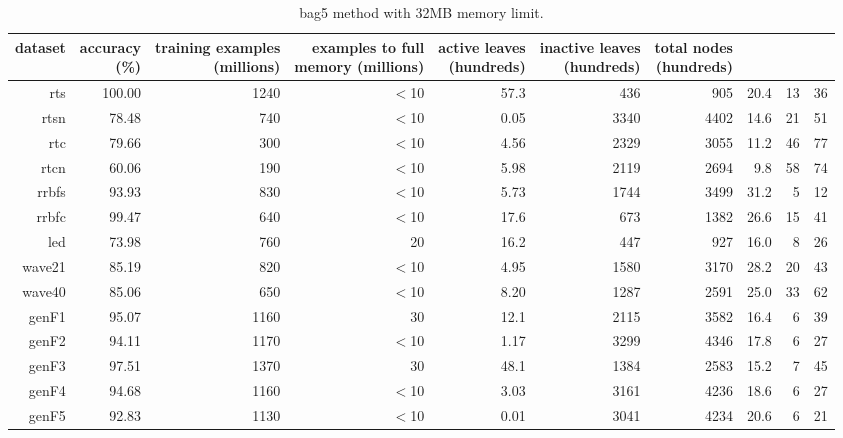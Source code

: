 \clearpage
\begin{table}
\caption{{\sc bag5} method with 32MB memory limit.}
\label{tab:bag5-32MB}
\centering
\begin{tabular}{|r|r|r|r|r|r|r|r|r|r|}
\hline
dataset	&
\rotatebox{90}{\parbox{9em}{accuracy\\(\%)}} &
\rotatebox{90}{\parbox{9em}{training examples\\(millions)}} &
\rotatebox{90}{\parbox{9em}{examples to full\\memory (millions)}} &
\rotatebox{90}{\parbox{9em}{active leaves\\(hundreds)}} &
\rotatebox{90}{\parbox{9em}{inactive leaves\\(hundreds)}} &
\rotatebox{90}{\parbox{9em}{total nodes\\(hundreds)}} &
\rotatebox{90}{\parbox{9em}{average tree depth}}	&
\rotatebox{90}{\parbox{9em}{training speed (\%)}} &
\rotatebox{90}{\parbox{9em}{prediction speed (\%)}} \\
\hline
{\sc rts} & 100.00 & 1240 & $<$10 & 57.3 & 436 & 905 & 20.4 & 13 & 36 \\
{\sc rtsn} & 78.48 & 740 & $<$10 & 0.05 & 3340 & 4402 & 14.6 & 21 & 51 \\
{\sc rtc} & 79.66 & 300 & $<$10 & 4.56 & 2329 & 3055 & 11.2 & 46 & 77 \\
{\sc rtcn} & 60.06 & 190 & $<$10 & 5.98 & 2119 & 2694 & 9.8 & 58 & 74 \\
{\sc rrbfs} & 93.93 & 830 & $<$10 & 5.73 & 1744 & 3499 & 31.2 & 5 & 12 \\
{\sc rrbfc} & 99.47 & 640 & $<$10 & 17.6 & 673 & 1382 & 26.6 & 15 & 41 \\
{\sc led} & 73.98 & 760 & 20 & 16.2 & 447 & 927 & 16.0 & 8 & 26 \\
{\sc wave21} & 85.19 & 820 & $<$10 & 4.95 & 1580 & 3170 & 28.2 & 20 & 43 \\
{\sc wave40} & 85.06 & 650 & $<$10 & 8.20 & 1287 & 2591 & 25.0 & 33 & 62 \\
{\sc genF1} & 95.07 & 1160 & 30 & 12.1 & 2115 & 3582 & 16.4 & 6 & 39 \\
{\sc genF2} & 94.11 & 1170 & $<$10 & 1.17 & 3299 & 4346 & 17.8 & 6 & 27 \\
{\sc genF3} & 97.51 & 1370 & 30 & 48.1 & 1384 & 2583 & 15.2 & 7 & 45 \\
{\sc genF4} & 94.68 & 1160 & $<$10 & 3.03 & 3161 & 4236 & 18.6 & 6 & 27 \\
{\sc genF5} & 92.83 & 1130 & $<$10 & 0.01 & 3041 & 4234 & 20.6 & 6 & 21 \\

\end{tabular}
\end{table}
